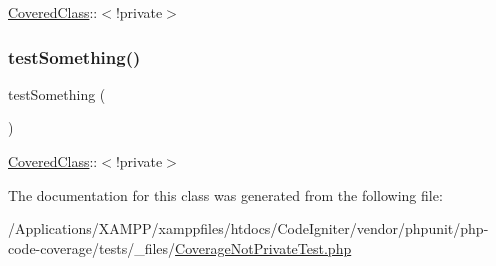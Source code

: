 \mbox{\hyperlink{class_covered_class}{Covered\+Class}}\+:\+:$<$!private$>$ \mbox{\label{class_coverage_not_private_test_a0fc4e17369bc9607ebdd850d9eda8167}} 
\subsubsection{\texorpdfstring{test\+Something()}{testSomething()}\hspace{0.1cm}{\footnotesize\ttfamily [2/2]}}
{\footnotesize\ttfamily test\+Something (\begin{DoxyParamCaption}{ }\end{DoxyParamCaption})}

\mbox{\hyperlink{class_covered_class}{Covered\+Class}}\+:\+:$<$!private$>$ 

The documentation for this class was generated from the following file\+:\begin{DoxyCompactItemize}
\item 
/\+Applications/\+X\+A\+M\+P\+P/xamppfiles/htdocs/\+Code\+Igniter/vendor/phpunit/php-\/code-\/coverage/tests/\+\_\+files/\mbox{\hyperlink{php-code-coverage_2tests_2__files_2_coverage_not_private_test_8php}{Coverage\+Not\+Private\+Test.\+php}}\end{DoxyCompactItemize}
